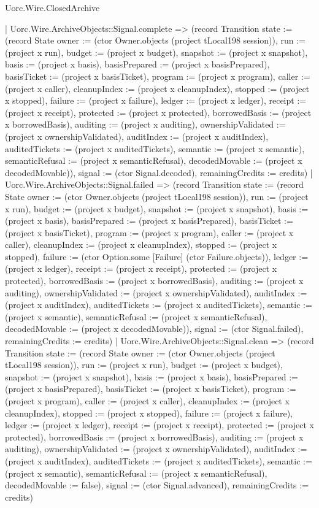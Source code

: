 \begin{lexlean}{Uorc.Wire.ClosedArchive}
\begin{semanticmodule}
{    | Uorc.Wire.ArchiveObjects::Signal.complete => (record Transition {state := (record State {owner := (ctor Owner.objects (project tLocal198 session)), run := (project x run), budget := (project x budget), snapshot := (project x snapshot), basis := (project x basis), basisPrepared := (project x basisPrepared), basisTicket := (project x basisTicket), program := (project x program), caller := (project x caller), cleanupIndex := (project x cleanupIndex), stopped := (project x stopped), failure := (project x failure), ledger := (project x ledger), receipt := (project x receipt), protected := (project x protected), borrowedBasis := (project x borrowedBasis), auditing := (project x auditing), ownershipValidated := (project x ownershipValidated), auditIndex := (project x auditIndex), auditedTickets := (project x auditedTickets), semantic := (project x semantic), semanticRefusal := (project x semanticRefusal), decodedMovable := (project x decodedMovable)}), signal := (ctor Signal.decoded), remainingCredits := credits})
    | Uorc.Wire.ArchiveObjects::Signal.failed => (record Transition {state := (record State {owner := (ctor Owner.objects (project tLocal198 session)), run := (project x run), budget := (project x budget), snapshot := (project x snapshot), basis := (project x basis), basisPrepared := (project x basisPrepared), basisTicket := (project x basisTicket), program := (project x program), caller := (project x caller), cleanupIndex := (project x cleanupIndex), stopped := (project x stopped), failure := (ctor Option.some [Failure] (ctor Failure.objects)), ledger := (project x ledger), receipt := (project x receipt), protected := (project x protected), borrowedBasis := (project x borrowedBasis), auditing := (project x auditing), ownershipValidated := (project x ownershipValidated), auditIndex := (project x auditIndex), auditedTickets := (project x auditedTickets), semantic := (project x semantic), semanticRefusal := (project x semanticRefusal), decodedMovable := (project x decodedMovable)}), signal := (ctor Signal.failed), remainingCredits := credits})
    | Uorc.Wire.ArchiveObjects::Signal.clean => (record Transition {state := (record State {owner := (ctor Owner.objects (project tLocal198 session)), run := (project x run), budget := (project x budget), snapshot := (project x snapshot), basis := (project x basis), basisPrepared := (project x basisPrepared), basisTicket := (project x basisTicket), program := (project x program), caller := (project x caller), cleanupIndex := (project x cleanupIndex), stopped := (project x stopped), failure := (project x failure), ledger := (project x ledger), receipt := (project x receipt), protected := (project x protected), borrowedBasis := (project x borrowedBasis), auditing := (project x auditing), ownershipValidated := (project x ownershipValidated), auditIndex := (project x auditIndex), auditedTickets := (project x auditedTickets), semantic := (project x semantic), semanticRefusal := (project x semanticRefusal), decodedMovable := false}), signal := (ctor Signal.advanced), remainingCredits := credits})
}
\end{semanticmodule}
\end{lexlean}

